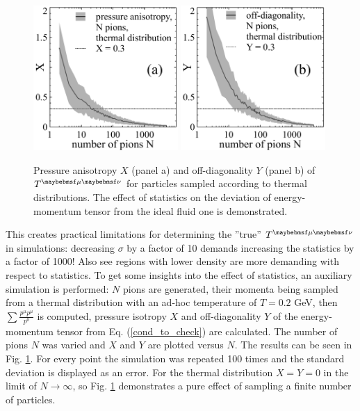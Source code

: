 \begin{figure}
  \includegraphics[width = 0.49\textwidth]{plots/thermalization_urqmd/x_pure_stat.pdf}
  \includegraphics[width = 0.49\textwidth]{plots/thermalization_urqmd/y_pure_stat.pdf}
  \caption{Pressure anisotropy $X$ (panel a) and off-diagonality $Y$ (panel b)
  of $\Tmn$ for particles sampled according to thermal distributions. The effect
  of statistics on the deviation of energy-momentum tensor from the ideal fluid
  one is demonstrated.}
  \label{FIG:pure_stat_effect}
\end{figure}

This creates practical limitations for determining the ''true'' $\Tmn$ in
simulations: decreasing $\sigma$ by a factor of 10 demands increasing the statistics
by a factor of 1000! Also see regions with lower density are more demanding
with respect to statistics. To get some insights into the effect of statistics, 
an auxiliary simulation is performed: $N$ pions are generated, their momenta being
sampled from a thermal distribution with an ad-hoc temperature of $T = 0.2$ GeV,
then $\sum \frac{p^{\mu} p^{\mu}}{p^0}$ is computed, pressure isotropy $X$ and
off-diagonality $Y$ of the energy-momentum tensor from Eq. (\ref{cond_to_check})
are calculated. The number of pions $N$ was varied and $X$ and $Y$ are plotted versus
$N$. The results can be seen in Fig. \ref{FIG:pure_stat_effect}. For every point
the simulation was repeated 100 times and the standard deviation is displayed as
an error. For the thermal distribution $X=Y=0$ in the limit of $N\to \infty$, so
Fig. \ref{FIG:pure_stat_effect} demonstrates a pure effect of sampling a finite
number of particles.


